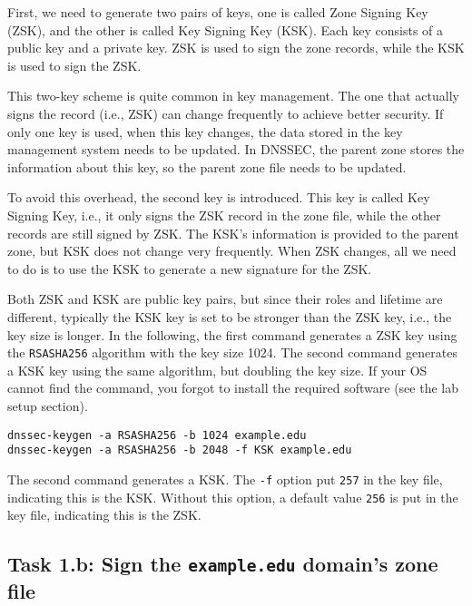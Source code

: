 First, we need to generate two pairs of keys, one is called Zone Signing Key (ZSK), and 
the other is called Key Signing Key (KSK). Each key consists of a public key and a private key.
ZSK is used to sign the zone records, while the KSK is used to sign the ZSK. 

This two-key scheme is quite common in key management. The one that actually signs the record
(i.e., ZSK) can change frequently to achieve better security. If only one key is used,
when this key changes, the data stored in the key management system needs to be updated. 
In DNSSEC, the parent zone stores the information about this key, so the parent zone file
needs to be updated. 

To avoid this overhead, the second key is introduced. This key is called 
Key Signing Key, i.e., it only signs the ZSK record in the zone file, while the 
other records are still signed by ZSK. The KSK's information is provided to 
the parent zone, but KSK does not change very frequently. When ZSK changes,
all we need to do is to use the KSK to generate a new signature for the ZSK. 

Both ZSK and KSK are public key pairs, but since their roles and lifetime are different,
typically the KSK key is set to be stronger than the ZSK key, i.e., the key size 
is longer. In the following, the first command generates a ZSK key using the 
\texttt{RSASHA256} algorithm with the key size 1024. The second command 
generates a KSK key using the same algorithm, but doubling the key size. 
If your OS cannot find the command, you forgot to 
install the required software (see the lab setup section).


\begin{lstlisting}
dnssec-keygen -a RSASHA256 -b 1024 example.edu
dnssec-keygen -a RSASHA256 -b 2048 -f KSK example.edu
\end{lstlisting}

The second command generates a KSK. The \texttt{-f} option 
put \texttt{257} in the key file, indicating this is the KSK. 
Without this option, a default value \texttt{256} is put in
the key file, indicating this is the ZSK.


\subsection{Task 1.b: Sign the \texttt{example.edu} domain's zone file} 

